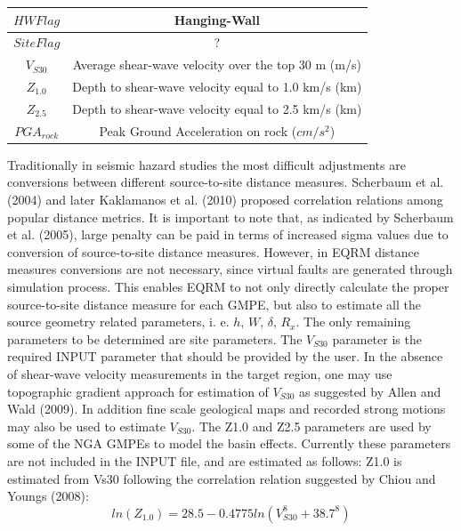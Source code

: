 \begin{table}[!t]
\begin{tabular}{|c|c|}
\hline $HW Flag$ & {\small Hanging-Wall}\\

\hline $Site Flag$ & {\small ?}\\

\hline $V_{S30}$ & {\small Average shear-wave velocity over the top 30 m (m/s)}\\

\hline $Z_{1.0}$ & {\small Depth to shear-wave velocity equal to 1.0
km/s
(km)}\\

\hline $Z_{2.5}$ & {\small Depth to shear-wave velocity equal to 2.5
km/s
(km)}\\

\hline $PGA_{rock}$ &{\small Peak Ground Acceleration on rock ($cm/s^2$)}\\
\hline

\end{tabular}
\end{table}

Traditionally in seismic hazard studies the most difficult
adjustments are conversions between different source-to-site
distance measures. Scherbaum et al. (2004) and later Kaklamanos et
al. (2010) proposed correlation relations among popular distance
metrics. It is important to note that, as indicated by Scherbaum et
al. (2005), large penalty can be paid in terms of increased sigma
values due to conversion of source-to-site distance measures.
However, in EQRM distance measures conversions are not necessary,
since virtual faults are generated through simulation process. This
enables EQRM to not only directly calculate the proper
source-to-site distance measure for each GMPE, but also to estimate
all the source geometry related parameters, i. e. $h$, $W$,
$\delta$, $R_x$. The only remaining parameters to be determined are
site parameters. The $V_{S30}$ parameter is the required INPUT
parameter that should be provided by the user. In the absence of
shear-wave velocity measurements in the target region, one may use
topographic gradient approach for estimation of $V_{S30}$ as
suggested by Allen and Wald (2009).  In addition fine scale
geological maps and recorded strong motions may also be used to
estimate $V_{S30}$. The Z1.0 and Z2.5 parameters are used by some of
the NGA GMPEs to model the basin effects. Currently these parameters
are not included in the INPUT file, and are estimated as follows:
Z1.0 is estimated from Vs30 following the correlation relation
suggested by Chiou and Youngs (2008):
\begin{equation}
ln(Z_{1.0}) = 28.5-0.4775ln(V_{S30}^8+38.7^8)
\end{equation}

